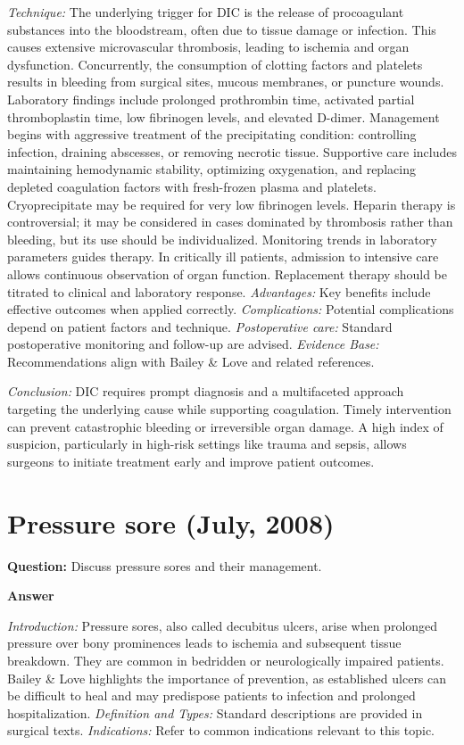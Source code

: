 \documentclass{article}
\begin{document}
\emph{Technique:} The underlying trigger for DIC is the release of procoagulant substances into the bloodstream, often due to tissue damage or infection. This causes extensive microvascular thrombosis, leading to ischemia and organ dysfunction. Concurrently, the consumption of clotting factors and platelets results in bleeding from surgical sites, mucous membranes, or puncture wounds. Laboratory findings include prolonged prothrombin time, activated partial thromboplastin time, low fibrinogen levels, and elevated D-dimer. Management begins with aggressive treatment of the precipitating condition: controlling infection, draining abscesses, or removing necrotic tissue. Supportive care includes maintaining hemodynamic stability, optimizing oxygenation, and replacing depleted coagulation factors with fresh-frozen plasma and platelets. Cryoprecipitate may be required for very low fibrinogen levels. Heparin therapy is controversial; it may be considered in cases dominated by thrombosis rather than bleeding, but its use should be individualized. Monitoring trends in laboratory parameters guides therapy. In critically ill patients, admission to intensive care allows continuous observation of organ function. Replacement therapy should be titrated to clinical and laboratory response.
\emph{Advantages:} Key benefits include effective outcomes when applied correctly.
\emph{Complications:} Potential complications depend on patient factors and technique.
\emph{Postoperative care:} Standard postoperative monitoring and follow-up are advised.
\emph{Evidence Base:} Recommendations align with Bailey & Love and related references.

\emph{Conclusion:} DIC requires prompt diagnosis and a multifaceted approach targeting the underlying cause while supporting coagulation. Timely intervention can prevent catastrophic bleeding or irreversible organ damage. A high index of suspicion, particularly in high-risk settings like trauma and sepsis, allows surgeons to initiate treatment early and improve patient outcomes.


\section{Pressure sore (July, 2008)}

\textbf{Question:} Discuss pressure sores and their management.

\textbf{Answer}

\emph{Introduction:} Pressure sores, also called decubitus ulcers, arise when prolonged pressure over bony prominences leads to ischemia and subsequent tissue breakdown. They are common in bedridden or neurologically impaired patients. Bailey & Love highlights the importance of prevention, as established ulcers can be difficult to heal and may predispose patients to infection and prolonged hospitalization.
\emph{Definition and Types:} Standard descriptions are provided in surgical texts.
\emph{Indications:} Refer to common indications relevant to this topic.
\end{document}
